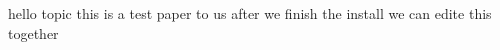 \documentclass[12pt]{article}
\begin{document}
    
    hello topic
    this is a test paper to us
    after we finish the install we can edite this together
\end{document}
